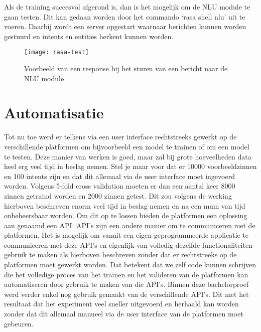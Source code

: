 Als de training succesvol afgerond is, dan is het mogelijk om de NLU module te gaan testen. Dit kan gedaan worden door het commando ‘rasa shell nlu’ uit te voeren. Daarbij wordt een server opgestart waarnaar berichten kunnen worden gestuurd en intents en entities herkent kunnen worden. 

\begin{figure}[H]
    \label{fig:rasa-test}
    \centering
    \texttt{[image: rasa-test]}
    \caption{Voorbeeld van een response bij het sturen van een bericht naar de NLU module}
\end{figure}

\section{Automatisatie}
\label{sec:automatisatie}

Tot nu toe werd er telkens via een user interface rechtstreeks gewerkt op de verschillende platformen om bijvoorbeeld een model te trainen of om een model te testen. Deze manier van werken is goed, maar zal bij grote hoeveelheden data heel erg veel tijd in beslag nemen. Stel je maar voor dat er 10000 voorbeeldzinnen  en 100 intents zijn en dat dit allemaal via de user interface moet ingevoerd worden. Volgens 5-fold cross validation moeten er dan een aantal keer 8000 zinnen getraind worden en 2000 zinnen getest. Dit zou volgens de werking hierboven beschreven enorm veel tijd in beslag nemen en na een mum van tijd onbeheersbaar worden. Om dit op te lossen bieden de platformen een oplossing aan genaamd een API. API’s zijn een andere manier om te communiceren met de platformen. Het is mogelijk om vanuit een eigen geprogrammeerde applicatie te communiceren met deze API’s en eigenlijk van volledig dezelfde functionaliteiten gebruik te maken als hierboven beschreven zonder dat er rechtstreeks op de platformen moet gewerkt worden. Dat betekent dat we zelf code kunnen schrijven die het volledige proces van het trainen en het valideren van de platformen kan automatiseren door gebruik te maken van die API’s. Binnen deze bachelorproef werd verder enkel nog gebruik gemaakt van de verschillende API’s. Dit met het resultaat dat het experiment veel sneller uitgevoerd en herhaald kan worden zonder dat dit allemaal manueel via de user interface van de platformen moet gebeuren.

